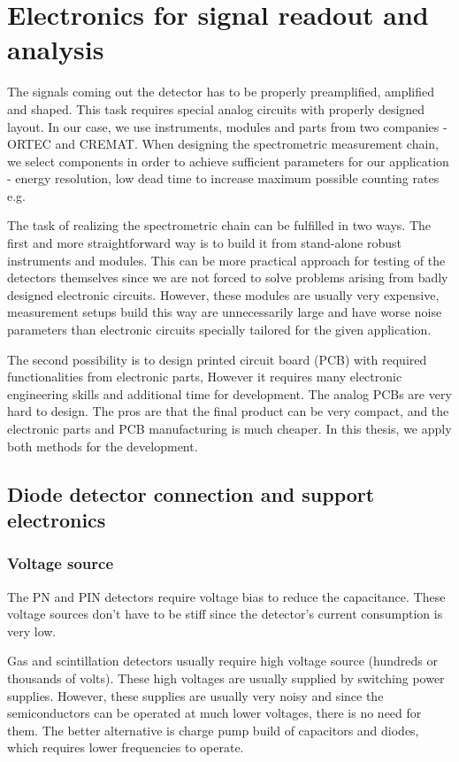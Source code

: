 
\chapter{Electronics for signal readout and analysis}
The signals coming out the detector has to be properly preamplified, amplified and shaped. This  task requires special analog circuits with properly designed layout. 
In our case, we use instruments, modules and parts from two companies - ORTEC and CREMAT. When designing the spectrometric measurement chain, we select components in order to achieve sufficient parameters for our application - energy resolution, low dead time to increase maximum possible counting rates e.g. 
\par
The task of realizing the spectrometric chain can be fulfilled in two ways. The first and more straightforward way is to build it from stand-alone robust instruments and modules. This can be more practical approach for testing of the detectors themselves since we are not forced to solve problems arising from badly designed electronic circuits. However, these modules are usually very expensive, measurement setups build this way are unnecessarily large and have worse noise parameters than electronic circuits specially tailored for the given application.
\par
The second possibility is to design printed circuit board (PCB) with required functionalities from electronic parts, However it requires many electronic engineering skills and additional time for development. The analog PCBs are very hard to design. The pros are that the final product can be very compact, and the electronic parts and PCB manufacturing is much cheaper. In this thesis, we apply both methods for the development.



\section{Diode detector connection and support electronics}
\subsection{Voltage source}
The PN and PIN detectors require voltage bias to reduce the capacitance.
These voltage sources don't have to be stiff since the detector's current consumption is very low.
\par
Gas and scintillation detectors usually require high voltage source (hundreds or thousands of volts). These high voltages are usually supplied by switching power supplies.
However, these supplies are usually very noisy and since the semiconductors can be operated at much lower voltages, there is no need for them. The better alternative is charge pump build of capacitors and diodes, which requires lower frequencies to operate.
